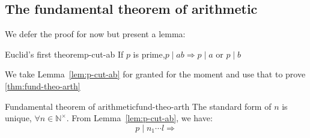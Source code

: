 \documentclass[dvipsnames]{article}
\newcommand{\refLemma}[1]{Lemma~\ref{lem:#1}}
\begin{document}
\subsection{The fundamental theorem of arithmetic}
\label{sec:fund-theo-arth}

We defer the proof for now but present a lemma:
\begin{myLem}{Euclid's first theorem}{p-cut-ab} 
  If $p$ is prime,$
  p \mid ab \Rightarrow p \mid a \text{ or } p \mid b$
\end{myLem}

We take \refLemma{p-cut-ab} for granted for the moment and use that to prove
\cref{thm:fund-theo-arth}

\begin{myTheo}{Fundamental theorem of arithmetic}{fund-theo-arth}
  The standard form of $n$ is unique, $\forall n \in \mathbb{N}^{\times}$.
  \tcblower{}
  From \refLemma{p-cut-ab}, we have:
  \[ p\mid n_1\dotsm{} l \Rightarrow \]
\end{myTheo}
\end{document}

